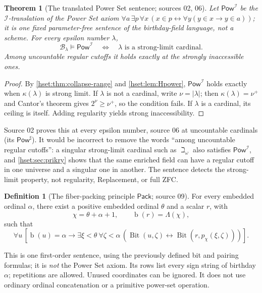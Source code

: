 \documentclass[11pt,letterpaper]{article}
\newtheorem{theorem}{Theorem}[section]
\theoremstyle{definition}
\newtheorem{definition}[definition]{Definition}\aliascntresetthe{definition}
\theoremstyle{remark}
\newcommand{\bd}{\operatorname{b}}
\newcommand{\B}{\mathcal B}
\newcommand{\I}{\mathcal I}
\newcommand{\Bit}{\operatorname{Bit}}
\newcommand{\Pack}{\mathsf{Pack}}
\newcommand{\PowI}{\mathsf{Pow}^{\I}}
\newcommand{\card}[1]{\lvert#1\rvert}
\begin{document}
\begin{theorem}[The translated Power Set sentence; sources 02, 06]\label{hset:thm:power}
Let $\PowI$ be the $\I$-translation of the Power Set axiom
$\forall a\,\exists p\,\forall x\,(x\in p\leftrightarrow\forall y(y\in x\to y\in a))$;
it is one fixed parameter-free sentence of the birthday-field language, not a
scheme. For every epsilon number $\lambda$,
\[
 \B_\lambda\models\PowI
 \quad\Longleftrightarrow\quad
 \lambda\text{ is a strong-limit cardinal}.
\]
Among uncountable regular cutoffs it holds exactly at the strongly inaccessible
ones.
\end{theorem}
\begin{proof}
By \cref{hset:thm:collapse-range} and \cref{hset:lem:Hpower}, $\PowI$ holds
exactly when $\kappa(\lambda)$ is strong limit. If $\lambda$ is not a cardinal,
write $\nu=\card\lambda$; then $\kappa(\lambda)=\nu^+$ and Cantor's theorem gives
$2^\nu\ge\nu^+$, so the condition fails. If $\lambda$ is a cardinal, its ceiling
is itself. Adding regularity yields strong inaccessibility.
\end{proof}

Source 02 proves this at every epsilon number, source 06 at uncountable
cardinals (its $\mathsf{Pow}^\sharp$). It would be incorrect to remove the words
``among uncountable regular cutoffs'': a singular strong-limit cardinal such as
$\beth_\omega$ also satisfies $\PowI$, and \cref{hset:sec:prikry} shows that the
same enriched field can have a regular cutoff in one universe and a singular
one in another. The sentence detects the strong-limit property, not
regularity, Replacement, or full ZFC.

\begin{definition}[The fiber-packing principle $\Pack$; source 09]
For every embedded ordinal $\alpha$, there exist a positive embedded ordinal
$\theta$ and a scalar $r$, with
\[
 \chi=\theta+\alpha+1,
 \qquad\bd(r)=\Lambda(\chi),
\]
such that
\begin{equation}
 \forall u\,[\bd(u)=\alpha\longrightarrow
   \exists\xi<\theta\ \forall\zeta<\alpha\,
    (\Bit(u,\zeta)\leftrightarrow\Bit(r,p_\chi(\xi,\zeta)))].
 \label{hset:eq:packing}
\end{equation}
\end{definition}

This is one first-order sentence, using the previously defined bit and
pairing formulas; it is \emph{not} the Power Set axiom. Its rows list every sign
string of birthday $\alpha$; repetitions are allowed. Unused coordinates can
be ignored. It does not use ordinary ordinal concatenation or a primitive
power-set operation.
\end{document}

